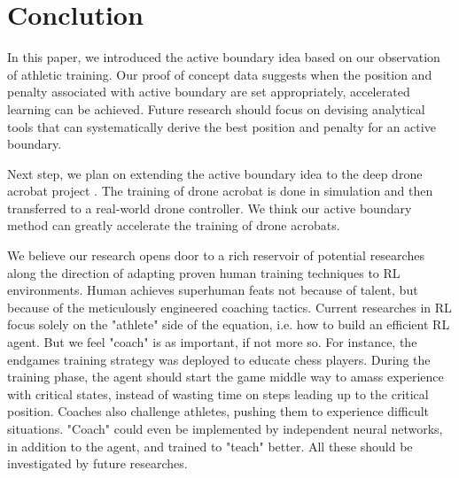 \documentclass[journal]{IEEEtran}
\begin{document}
\section{Conclution}

In this paper, we introduced the active boundary idea based on our observation of athletic training. Our proof of concept data suggests when the position and penalty associated with active boundary are set appropriately, accelerated learning can be achieved. Future research should focus on devising analytical tools that can systematically derive the best position and penalty for an active boundary.

Next step, we plan on extending the active boundary idea to the deep drone acrobat project \cite{Kaufmann2020DeepDA}. The training of drone acrobat is done in simulation and then transferred to a real-world drone controller. We think our active boundary method can greatly accelerate the training of drone acrobats. 

We believe our research opens door to a rich reservoir of potential researches along the direction of adapting proven human training techniques to RL environments. Human achieves superhuman feats not because of talent, but because of the meticulously engineered coaching tactics. Current researches in RL focus solely on the "athlete" side of the equation, i.e. how to build an efficient RL agent. But we feel "coach" is as important, if not more so.  For instance, the endgames training strategy was deployed to educate chess players. During the training phase, the agent should start the game middle way to amass experience with critical states, instead of wasting time on steps leading up to the critical position. Coaches also challenge athletes, pushing them to experience difficult situations. "Coach" could even be implemented by independent neural networks, in addition to the agent, and trained to "teach" better. All these should be investigated by future researches. 



\end{document}
